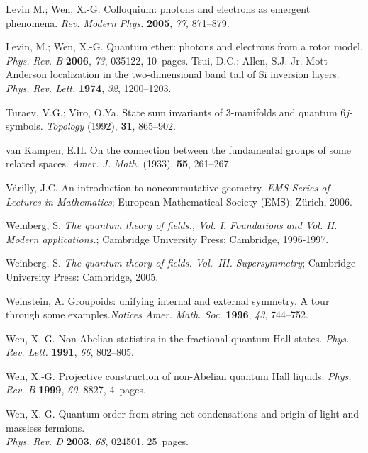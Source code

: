 \documentclass[12pt]{article}
\theoremstyle{plain}
\theoremstyle{definition}
\numberwithin{equation}{section}
\begin{document}
\begin{thebibliography}{99}
Levin M.; Wen, X.-G. Colloquium: photons and electrons as emergent phenomena. {\em Rev. Modern Phys.} {\bf 2005}, {\em 77}, 871--879. %

Levin, M.; Wen, X.-G. Quantum ether: photons and electrons from a rotor model. {\em Phys. Rev. B} {\bf 2006}, {\em 73}, 035122, 10~pages. %
Tsui, D.C.; Allen, S.J. Jr.  Mott--Anderson localization in the two-dimensional band tail of Si inversion layers. {\em Phys. Rev. Lett.}  {\bf 1974}, {\em 32}, 1200--1203.

Turaev, V.G.; Viro, O.Ya. State sum invariants of 3-manifolds and quantum $6j$-symbols. \emph{Topology} (1992), {\bf 31}, 865--902.

van Kampen, E.H. On the connection between the fundamental groups of some related spaces. \emph{Amer. J. Math.} (1933), {\bf 55}, 261--267.

V\'arilly, J.C. An introduction to noncommutative geometry. {\em EMS Series of Lectures in Mathematics}; European Mathematical Society (EMS): Z\"{u}rich, 2006.

Weinberg, S. {\em The quantum theory of fields., Vol. I. Foundations and Vol. II. Modern applications.}; Cambridge University Press: Cambridge, 1996-1997.

Weinberg, S. {\em The quantum theory of fields. Vol.~III. Supersymmetry}; Cambridge University Press: Cambridge, 2005.

Weinstein, A.  Groupoids: unifying internal and external symmetry. A tour through some examples.{\em Notices Amer. Math. Soc.} {\bf 1996}, {\em 43}, 744--752. 

Wen, X.-G.  Non-Abelian statistics in the fractional quantum Hall states. {\em Phys. Rev. Lett.} {\bf 1991}, {\em 66}, 802--805.

Wen, X.-G.  Projective construction of non-Abelian quantum Hall liquids. {\em Phys. Rev. B} {\bf 1999}, {\em 60}, 8827, 4~pages. %

Wen, X.-G. Quantum order from string-net condensations and origin of light and massless fermions.\\ {\em Phys. Rev. D} {\bf 2003}, {\em 68}, 024501, 25~pages. %


\end{thebibliography}
\end{document}
